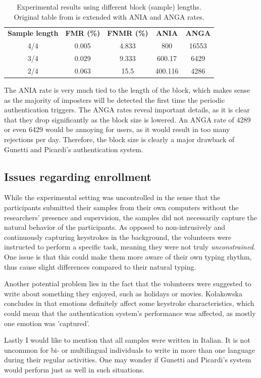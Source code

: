 \documentclass[informationsecurity]{gucmasterproject}
\begin{document}
\begin{table}[h]
\centering
\begin{tabular}{ccccc}
 \bf Sample length & \bf FMR (\%) & \bf FNMR (\%) & \bf ANIA & \bf ANGA \\
 4/4 & 0.005 & 4.833 & 800 & 16553 \\
 3/4 & 0.029 & 9.333 & 600.17 & 6429\\
 2/4 & 0.063 & 15.5 & 400.116 & 4286
\end{tabular}
\caption{Experimental results using different block (sample) lengths. Original table from \cite{gnp} is extended with ANIA and ANGA rates.}
\label{tab:gnp-blocksizes}
\end{table}
The ANIA rate is very much tied to the length of the block, which makes sense as the majority of imposters will be detected the first time the periodic authentication triggers.
The ANGA rates reveal important details, as it is clear that they drop significantly as the block size is lowered.
An ANGA rate of 4289 or even 6429 would be annoying for users, as it would result in too many rejections per day.
Therefore, the block size is clearly a major drawback of Gunetti and Picardi's authentication system.

\subsection{Issues regarding enrollment}
While the experimental setting was uncontrolled in the sense that the participants submitted their samples from their own computers without the researchers' presence and supervision, the samples did not necessarily capture the natural behavior of the participants.
As opposed to non-intrusively and continuously capturing keystrokes in the background, the volunteers were instructed to perform a specific task, meaning they were not truly \textit{unconstrained}.
One issue is that this could make them more aware of their own typing rhythm, thus cause slight differences compared to their natural typing.

Another potential problem lies in the fact that the volunteers were suggested to write about something they enjoyed, such as holidays or movies.
Kołakowska concludes in \cite{emotion} that emotions definitely affect some keystroke characteristics, which could mean that the authentication system's performance was affected, as mostly one emotion was 'captured'.

Lastly I would like to mention that all samples were written in Italian.
It is not uncommon for bi- or multilingual individuals to write in more than one language during their regular activities.
One may wonder if Gunetti and Picardi's system would perform just as well in such situations.
\end{document}
